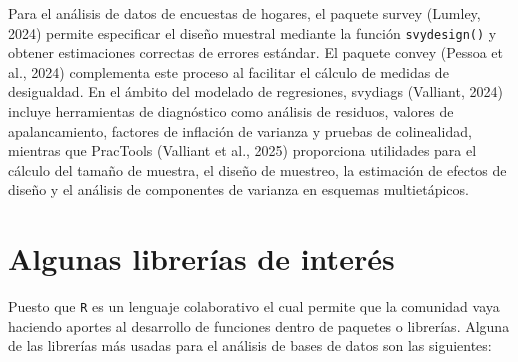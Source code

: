 \documentclass[
  12pt,
]{book}
\begin{document}
Para el análisis de datos de encuestas de hogares, el paquete survey (Lumley, 2024) permite especificar el diseño muestral mediante la función \texttt{svydesign()} y obtener estimaciones correctas de errores estándar. El paquete convey (Pessoa et al., 2024) complementa este proceso al facilitar el cálculo de medidas de desigualdad. En el ámbito del modelado de regresiones, svydiags (Valliant, 2024) incluye herramientas de diagnóstico como análisis de residuos, valores de apalancamiento, factores de inflación de varianza y pruebas de colinealidad, mientras que PracTools (Valliant et al., 2025) proporciona utilidades para el cálculo del tamaño de muestra, el diseño de muestreo, la estimación de efectos de diseño y el análisis de componentes de varianza en esquemas multietápicos.

\section{Algunas librerías de interés}\label{algunas-libreruxedas-de-interuxe9s}

Puesto que \texttt{R} es un lenguaje colaborativo el cual permite que la comunidad vaya haciendo aportes al desarrollo de funciones dentro de paquetes o librerías. Alguna de las librerías más usadas para el análisis de bases de datos son las siguientes:
\end{document}
